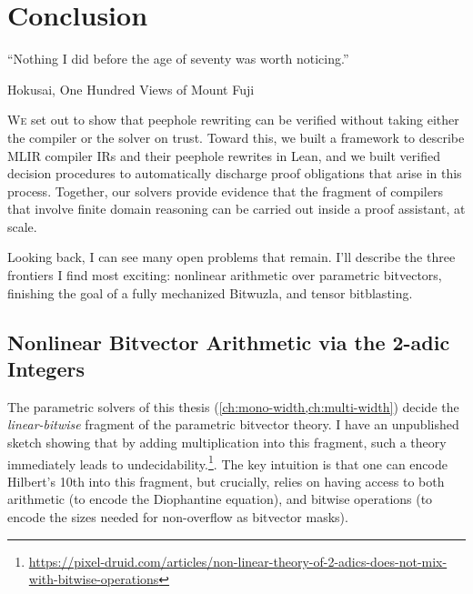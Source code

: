 \chapter{Conclusion}
\label{ch:future-work}
\epigraph{``Nothing I did before the age of seventy was worth noticing.''}{Hokusai, One Hundred Views of Mount Fuji}

\lettrine{W}{e} set out to show that peephole rewriting can be verified without taking either the compiler or the solver on trust.
Toward this, we built a framework to describe MLIR compiler IRs and their peephole rewrites in Lean,
and we built verified decision procedures to automatically discharge proof obligations that arise in this process.
Together, our solvers provide evidence that the fragment of compilers that involve finite domain reasoning
can be carried out inside a proof assistant, at scale.

Looking back, I can see many open problems that remain. I'll describe the three frontiers I find most exciting:
nonlinear arithmetic over parametric bitvectors, finishing the goal of a fully mechanized Bitwuzla, and tensor bitblasting.

\section{Nonlinear Bitvector Arithmetic via the 2-adic Integers}

The parametric solvers of this thesis (\cref{ch:mono-width,ch:multi-width})
decide the \emph{linear-bitwise} fragment of the parametric bitvector theory.
I have an unpublished sketch showing that by adding multiplication into this fragment,
such a theory immediately leads to
undecidability.\footnote{%
\url{https://pixel-druid.com/articles/non-linear-theory-of-2-adics-does-not-mix-with-bitwise-operations}}.
The key intuition is that one can encode Hilbert's 10th into this fragment,
but crucially, relies on having access to both arithmetic (to encode the Diophantine equation),
and bitwise operations (to encode the sizes needed for non-overflow as bitvector masks).

